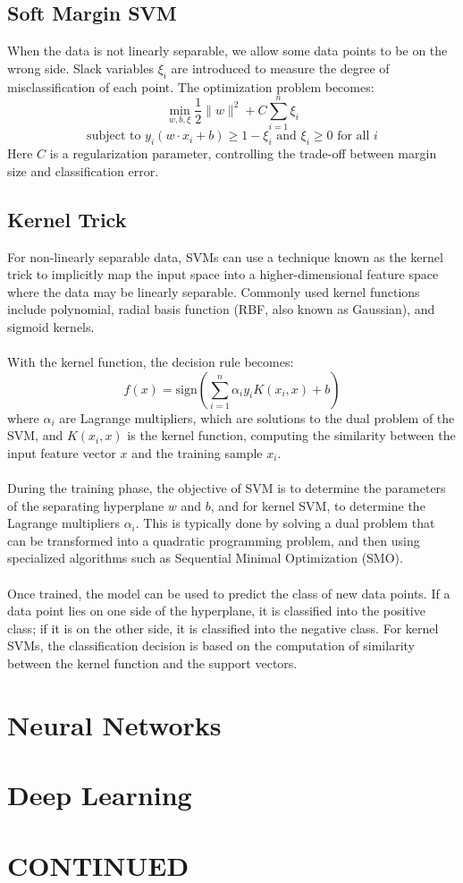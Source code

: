 \documentclass{article}
\begin{document}
\subsection{Soft Margin SVM}
When the data is not linearly separable, we allow some data points to be on the wrong side. Slack variables \( \xi_i \) are introduced to measure the degree of misclassification of each point. The optimization problem becomes:
\[ \min_{w,b,\xi} \frac{1}{2} \|w\|^2 + C \sum_{i=1}^{n} \xi_i \]
\[ \text{subject to } y_i (w \cdot x_i + b) \geq 1 - \xi_i \text{ and } \xi_i \geq 0 \text{ for all } i \]
Here \( C \) is a regularization parameter, controlling the trade-off between margin size and classification error.

\subsection{Kernel Trick}
For non-linearly separable data, SVMs can use a technique known as the kernel trick to implicitly map the input space into a higher-dimensional feature space where the data may be linearly separable. Commonly used kernel functions include polynomial, radial basis function (RBF, also known as Gaussian), and sigmoid kernels.\\
 \\
With the kernel function, the decision rule becomes:
\[ f(x) = \text{sign} \left( \sum_{i=1}^{n} \alpha_i y_i K(x_i, x) + b \right) \]
where \( \alpha_i \) are Lagrange multipliers, which are solutions to the dual problem of the SVM, and \( K(x_i, x) \) is the kernel function, computing the similarity between the input feature vector \( x \) and the training sample \( x_i \).\\
 \\
During the training phase, the objective of SVM is to determine the parameters of the separating hyperplane \( w \) and \( b \), and for kernel SVM, to determine the Lagrange multipliers \( \alpha_i \). This is typically done by solving a dual problem that can be transformed into a quadratic programming problem, and then using specialized algorithms such as Sequential Minimal Optimization (SMO).\\
 \\
Once trained, the model can be used to predict the class of new data points. If a data point lies on one side of the hyperplane, it is classified into the positive class; if it is on the other side, it is classified into the negative class. For kernel SVMs, the classification decision is based on the computation of similarity between the kernel function and the support vectors.


\newpage
\section{Neural Networks}



\newpage
\section{Deep Learning}



\newpage
\section{CONTINUED}
\end{document}
